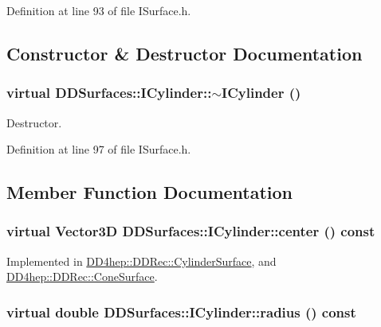 Definition at line 93 of file ISurface.h.

\subsection{Constructor \& Destructor Documentation}
\hypertarget{class_d_d_surfaces_1_1_i_cylinder_a8b9d98560a1241956335604eb3c51c16}{
\subsubsection[{$\sim$ICylinder}]{\setlength{\rightskip}{0pt plus 5cm}virtual DDSurfaces::ICylinder::$\sim$ICylinder ()}}
\label{class_d_d_surfaces_1_1_i_cylinder_a8b9d98560a1241956335604eb3c51c16}


Destructor. 

Definition at line 97 of file ISurface.h.

\subsection{Member Function Documentation}
\hypertarget{class_d_d_surfaces_1_1_i_cylinder_acebccc0b84cc5b7e53bb2e56fb991f16}{
\subsubsection[{center}]{\setlength{\rightskip}{0pt plus 5cm}virtual {\bf Vector3D} DDSurfaces::ICylinder::center () const}}
\label{class_d_d_surfaces_1_1_i_cylinder_acebccc0b84cc5b7e53bb2e56fb991f16}


Implemented in \hyperlink{class_d_d4hep_1_1_d_d_rec_1_1_cylinder_surface_a2f781fa234e46d60caa6d07271c2e922}{DD4hep::DDRec::CylinderSurface}, and \hyperlink{class_d_d4hep_1_1_d_d_rec_1_1_cone_surface_abfdad3ecbda7070c2b2b4b4d48b23ccb}{DD4hep::DDRec::ConeSurface}.\hypertarget{class_d_d_surfaces_1_1_i_cylinder_a66bc9b90cdb121938eff646b2fd21385}{
\subsubsection[{radius}]{\setlength{\rightskip}{0pt plus 5cm}virtual double DDSurfaces::ICylinder::radius () const}}
\label{class_d_d_surfaces_1_1_i_cylinder_a66bc9b90cdb121938eff646b2fd21385}


